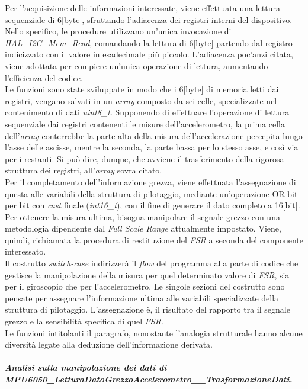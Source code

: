 Per l'acquisizione delle informazioni interessate, viene effettuata una lettura sequenziale di 6[byte], sfruttando l'adiacenza dei registri interni del dispositivo.
Nello specifico, le procedure utilizzano un'unica invocazione di \textit{HAL\_I2C\_Mem\_Read}, comandando la lettura di 6[byte] partendo dal registro indicizzato con il valore in esadecimale più piccolo. L'adiacenza poc'anzi citata, viene adottata per compiere un'unica operazione di lettura, aumentando l'efficienza del codice.\\
Le funzioni sono state sviluppate in modo che i 6[byte] di memoria letti dai registri, vengano salvati in un \textit{array} composto da sei celle, specializzate nel contenimento di dati \textit{uint8\_t}.
Supponendo di effettuare l'operazione di lettura sequenziale dai registri contenenti le misure dell'accelerometro, la prima cella dell'\textit{array} conterrebbe la parte alta della misura dell'accelerazione percepita lungo l'asse delle ascisse, mentre la seconda, la parte bassa per lo stesso asse, e così via per i restanti.
Si può dire, dunque, che avviene il trasferimento della rigorosa struttura dei registri, all'\textit{array} sovra citato.\\
Per il completamento dell'informazione grezza, viene effettuata l'assegnazione di questa alle variabili della struttura di pilotaggio, mediante un'operazione OR bit per bit con \textit{cast} finale (\textit{int16\_t}), con il fine di generare il dato completo a 16[bit].\\
Per ottenere la misura ultima, bisogna manipolare il segnale grezzo con una metodologia dipendente dal \textit{Full Scale Range} attualmente impostato. Viene, quindi, richiamata la procedura di restituzione del \textit{FSR} a seconda del componente interessato.\\
Il costrutto \textit{switch-case} indirizzerà il \textit{flow} del programma alla parte di codice che gestisce la manipolazione della misura per quel determinato valore di \textit{FSR}, sia per il giroscopio che per l'accelerometro. Le singole sezioni del costrutto sono pensate per assegnare l'informazione ultima alle variabili specializzate della struttura di pilotaggio.
L'assegnazione è, il risultato del rapporto tra il segnale grezzo e la sensibilità specifica di quel \textit{FSR}.\\
Le funzioni intitolanti il paragrafo, nonostante l'analogia strutturale hanno alcune diversità legate alla deduzione dell'informazione derivata.
\subparagraph{Analisi sulla manipolazione dei dati di\\MPU6050\_LetturaDatoGrezzoAccelerometro\_\_TrasformazioneDati.}

